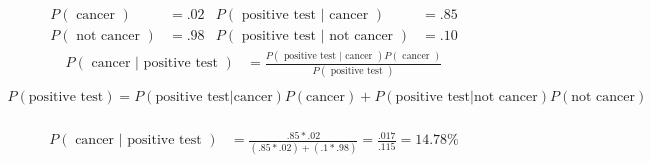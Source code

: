 \documentclass[draft]{exam} %
\theoremstyle{definition} \newtheorem*{defn}{Definition}
\begin{document}
\begin{questions}
\begin{solution} %
\begin{align*}
P(\text{ cancer }) &= .02    & P(\text{ positive test }|\text{ cancer }) &= .85\\
P(\text{ not cancer }) &= .98   & P(\text{ positive test }|\text{ not cancer }) &= .10
\end{align*}
\begin{align*}
P(\text{ cancer }|\text{ positive test }) &= 
\frac{P(\text{ positive test }|\text{ cancer })P(\text{ cancer })}{P(\text{ positive test })} \\
\end{align*}
\begin{align*}
P(\text{positive test}) = P(\text{positive test}|\text{cancer})P(\text{cancer})+P(\text{positive test}|\text{not cancer})P(\text{not cancer}) \\
\end{align*}

\begin{align*}
P(\text{ cancer }|\text{ positive test })&=\frac{.85 * .02}{(.85*.02) +(.1*.98)}
=\frac{.017}{.115}
=14.78\% 
\end{align*}
\end{solution} %
\vfill

\end{questions} 
\end{document}
